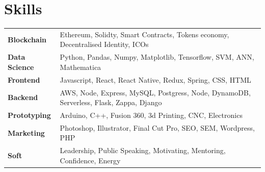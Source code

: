 \documentclass[11pt]{article}
\begin{document}
\section*{Skills}
\begin{tabularx}{\textwidth}{lX}
  \textbf{Blockchain}   & Ethereum, Solidty, Smart Contracts, Tokens economy,
                          Decentralised Identity, ICOs \\
  \textbf{Data Science} & Python, Pandas, Numpy, Matplotlib, Tensorflow, SVM, ANN,
                          Mathematica \\
  \textbf{Frontend}     & Javascript, React, React Native, Redux, Spring, CSS, HTML  \\
  \textbf{Backend}      & AWS, Node, Express, MySQL, Postgress, Node, DynamoDB,
                          Serverless, Flask, Zappa, Django \\
  \textbf{Prototyping}  & Arduino, C++, Fusion 360, 3d Printing, CNC, Electronics \\
  \textbf{Marketing}    & Photoshop, Illustrator, Final Cut Pro, SEO, SEM, Wordpress, PHP \\
  \textbf{Soft}         & Leadership, Public Speaking, Motivating, Mentoring, Confidence, Energy
\end{tabularx}
		




\end{document}

